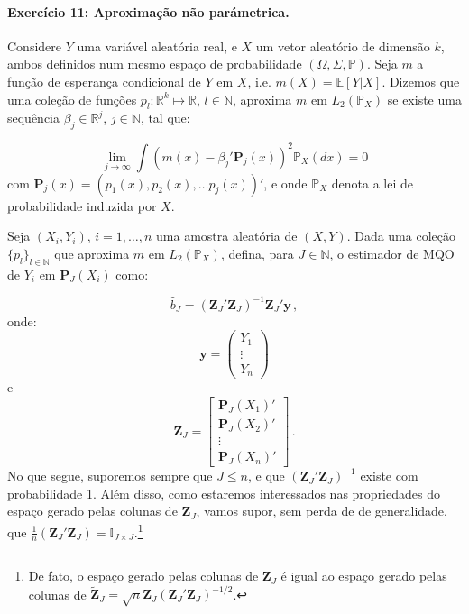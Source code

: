 \documentclass[10pt,a4paper]{article}
\begin{document}
 
 
 \paragraph{Exercício 11: Aproximação não parámetrica.}  Considere $Y$ uma variável aleatória real, e $X$ um vetor aleatório de dimensão $k$, ambos definidos num mesmo espaço de probabilidade $(\Omega, \Sigma, \mathbb{P})$. Seja $m$ a função de esperança condicional de $Y$ em $X$, i.e. $m(X) = \mathbb{E}[Y|X]$. Dizemos que uma coleção de funções $p_l: \mathbb{R}^k \mapsto \mathbb{R}$, $l \in \mathbb{N}$, aproxima $m$ em $L_2(\mathbb{P}_X)$ se existe uma sequência $\beta_j \in \mathbb{R}^j$, $j \in \mathbb{N}$, tal que:
 
 $$\lim_{j \to \infty}\int (m(x) - \beta_j'\boldsymbol{P}_j(x))^2 \mathbb{P}_X(dx) = 0$$
 com $\boldsymbol{P}_j(x) = (p_1(x),p_2(x),\ldots p_j(x))'$, e onde $\mathbb{P}_X$ denota a lei de probabilidade induzida por $X$.
 
 Seja $(X_i, Y_i)$, $i=1,\ldots, n$ uma amostra aleatória de $(X,Y)$. Dada uma coleção $\{p_l\}_{l\in \mathbb{N}}$ que aproxima $m$ em $L_2(\mathbb{P}_X)$, defina, para $J \in \mathbb{N}$, o estimador de MQO de $Y_i$ em $\boldsymbol{P}_J(X_i)$ como:
 
 $$\hat{b}_{J}  = \left(\boldsymbol{Z}_J' \boldsymbol{Z}_{J}\right)^{-1}\boldsymbol{Z}_J'\boldsymbol{y}\,, $$
 onde: $$\boldsymbol{y} = \begin{pmatrix}
 	Y_1\\
 	\vdots \\
 	Y_n
 \end{pmatrix}$$ e $$\boldsymbol{Z}_J = \begin{bmatrix}
 	\boldsymbol{P}_J(X_1) '\\
 	\boldsymbol{P}_J(X_2)' \\
 	\vdots \\
 	\boldsymbol{P}_J(X_n)'
 \end{bmatrix}\, .$$ No que segue, suporemos sempre que $J \leq n$, e que $\left(\boldsymbol{Z}_{J}' \boldsymbol{Z}_{J}\right)^{-1}$ existe com probabilidade 1. Além disso, como estaremos interessados nas propriedades do espaço gerado pelas colunas de $\boldsymbol{Z}_{J}$, vamos supor, sem perda de de generalidade, que $\frac{1}{n}\left(\boldsymbol{Z}_{J}'\boldsymbol{Z}_{J}\right) = \mathbb{I}_{J \times J}$.\footnote{De fato, o espaço gerado pelas colunas de $\boldsymbol{Z}_{J}$ é igual ao espaço gerado pelas colunas de $\tilde{\boldsymbol{Z}}_J = \sqrt{n}\boldsymbol{Z}_{J} (\boldsymbol{Z}_J'\boldsymbol{Z}_J)^{-1/2}$.}
 
\end{document}
